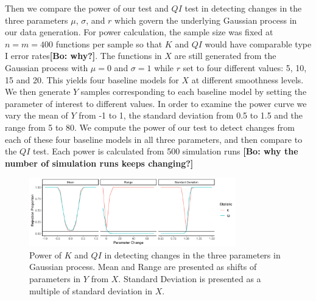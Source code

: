 \documentclass[12pt]{article}
\newcommand{\bl}[1]{\color{Red}\textbf{[Bo: #1]}\normalcolor}
\begin{document}
Then we compare the power of our test and $QI$ test in detecting changes in the three parameters $\mu$, $\sigma$, and $r$ which govern the underlying Gaussian process in our data generation. For power calculation, the sample size was fixed at $n = m = 400$ functions per sample so that $K$ and $QI$ would have comparable type I error rates\bl{why?}. The functions in $X$ are still generated from the Gaussian process with $\mu = 0$ and $\sigma = 1$ while $r$ set to four different values: 5, 10, 15 and 20. This yields four baseline models for $X$ at different smoothness levels. We then generate $Y$ samples corresponding to each baseline model by setting the parameter of interest to different values. In order to examine the power curve we vary the mean of $Y$ from -1 to 1, the standard deviation from 0.5 to 1.5 and the range from 5 to 80. 
We compute the power of our test to detect changes from each of these four baseline models in all three parameters, and then compare to the $QI$ test. Each power is calculated from 500 simulation runs \bl{why the number of simulation runs keeps changing?}  


\begin{figure}
	\begin{center}
    \includegraphics[width=0.8\textwidth,valign=c]{power/multi2d2.png}
    \caption{Power of $K$ and $QI$ in detecting changes in the three parameters in Gaussian process. Mean and Range are presented as shifts of parameters in $Y$ from $X$. Standard Deviation is presented as a multiple of standard deviation in $X$.}
    \label{power2d2}
    \end{center}
\end{figure}

\end{document}
